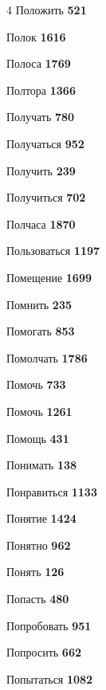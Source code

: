 \begin{multicols}{4}
\noindent Положить \dotfill \textbf{\color{secondary} 521}\par
\noindent Полок \dotfill \textbf{\color{secondary} 1616}\par
\noindent Полоса \dotfill \textbf{\color{secondary} 1769}\par
\noindent Полтора \dotfill \textbf{\color{secondary} 1366}\par
\noindent Получать \dotfill \textbf{\color{secondary} 780}\par
\noindent Получаться \dotfill \textbf{\color{secondary} 952}\par
\noindent Получить \dotfill \textbf{\color{secondary} 239}\par
\noindent Получиться \dotfill \textbf{\color{secondary} 702}\par
\noindent Полчаса \dotfill \textbf{\color{secondary} 1870}\par
\noindent Пользоваться \dotfill \textbf{\color{secondary} 1197}\par
\noindent Помещение \dotfill \textbf{\color{secondary} 1699}\par
\noindent Помнить \dotfill \textbf{\color{secondary} 235}\par
\noindent Помогать \dotfill \textbf{\color{secondary} 853}\par
\noindent Помолчать \dotfill \textbf{\color{secondary} 1786}\par
\noindent Помочь \dotfill \textbf{\color{secondary} 733}\par
\noindent Помочь \dotfill \textbf{\color{secondary} 1261}\par
\noindent Помощь \dotfill \textbf{\color{secondary} 431}\par
\noindent Понимать \dotfill \textbf{\color{secondary} 138}\par
\noindent Понравиться \dotfill \textbf{\color{secondary} 1133}\par
\noindent Понятие \dotfill \textbf{\color{secondary} 1424}\par
\noindent Понятно \dotfill \textbf{\color{secondary} 962}\par
\noindent Понять \dotfill \textbf{\color{secondary} 126}\par
\noindent Попасть \dotfill \textbf{\color{secondary} 480}\par
\noindent Попробовать \dotfill \textbf{\color{secondary} 951}\par
\noindent Попросить \dotfill \textbf{\color{secondary} 662}\par
\noindent Попытаться \dotfill \textbf{\color{secondary} 1082}\par

\end{multicols}
